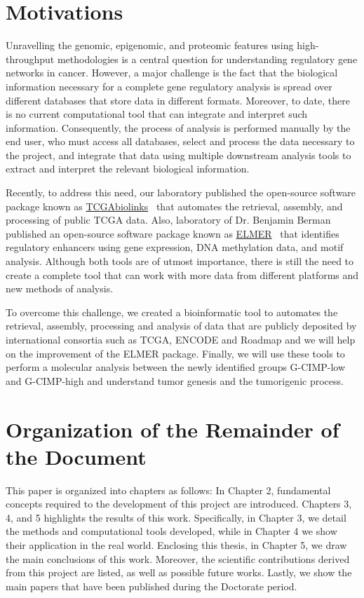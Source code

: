 \section{Motivations}

Unravelling the genomic, epigenomic, and proteomic features using high-throughput methodologies is a central question for understanding regulatory gene networks in cancer. However, a major challenge is the fact that the biological information necessary for a complete gene regulatory analysis is spread over different databases that store data in different formats. Moreover, to date, there is no current computational tool that can integrate and interpret such information. Consequently, the process of analysis is performed manually by the end user, who must access all databases, select and process the data necessary to the project, and integrate that data using multiple downstream analysis tools to extract and interpret the relevant biological information.

Recently, to address this need, our laboratory published the open-source software package known as \href{http://bioconductor.org/packages/TCGAbiolinks/}{TCGAbiolinks}~\cite{TCGAbiolinks} that automates the retrieval, assembly, and processing of public TCGA data. Also, laboratory of Dr. Benjamin Berman published an open-source software package known as \href{http://bioconductor.org/packages/ELMER/}{ELMER}~\cite{yao2015inferring} that identifies regulatory enhancers using gene expression, DNA methylation data, and motif analysis. Although both tools are of utmost importance, there is still the need to create a complete tool that can work with more data from different platforms and new methods of analysis.

To overcome this challenge, we created a bioinformatic tool to automates the retrieval, assembly, processing and analysis of data that are publicly deposited by international consortia such as TCGA, ENCODE and Roadmap and we will help on the improvement of the ELMER package. Finally, we will use these tools to perform a molecular analysis between the newly identified groups G-CIMP-low and G-CIMP-high and understand tumor genesis and the tumorigenic process.



\section{Organization of the Remainder of the Document}


This paper is organized into chapters as follows: In Chapter 2,
fundamental concepts required to the development of this project are introduced.
Chapters 3, 4, and 5 highlights the results of this work. Specifically, in Chapter 3,
we detail the methods and computational tools developed, while in Chapter 4 we
show their application in the real world. Enclosing this thesis, in Chapter 5,
we draw the main conclusions of this work. Moreover, the scientific contributions
derived from this project are listed, as well as possible future works. Lastly, we show the main papers
that have been published during the Doctorate period.
